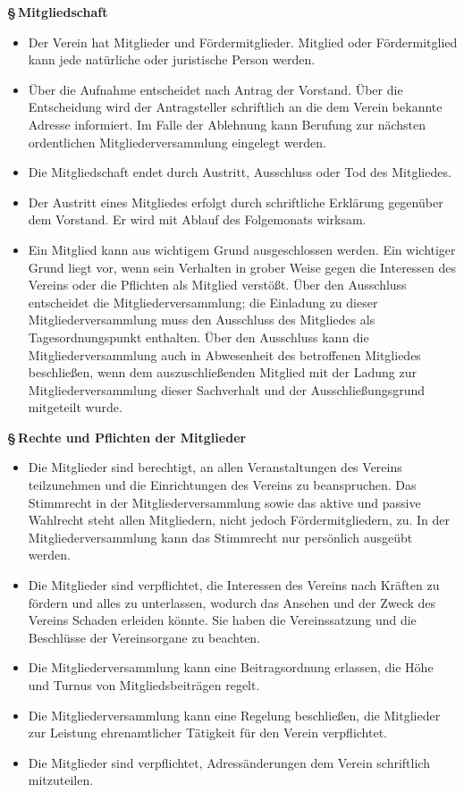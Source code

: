 \documentclass[11pt]{article}
\def\items#1{{%
  \itcounter0%
  \begin{itemize}
  #1
  \end{itemize}
}}
\let\it\item%
\def\item{
  \advance\itcounter1%
  \it[(\the\itcounter)]
}
\def\paragraf#1{
  \advance\itcounter1%
  \par\medskip
  {\large\bfseries \S\,\the\itcounter\quad#1}
  \par\smallskip
}
\begin{document}
\paragraf{Mitgliedschaft}

\items{
   \item Der Verein hat Mitglieder und F{\"o}rdermitglieder. Mitglied oder
   F{\"o}rdermitglied kann jede nat\"urliche oder juristische Person werden.
   \item {\"U}ber die Aufnahme entscheidet nach Antrag der Vorstand.
       {\"U}ber die Entscheidung wird der Antragsteller schriftlich an die dem Verein bekannte Adresse informiert.
       Im Falle der Ablehnung kann Berufung zur n{\"a}chsten
       ordentlichen Mitgliederversammlung eingelegt werden.
   \item Die Mitgliedschaft endet durch Austritt, Ausschluss oder Tod des Mitgliedes.
   \item Der Austritt eines Mitgliedes erfolgt durch schriftliche Erkl{\"a}rung gegen{\"u}ber
       dem Vorstand. Er wird mit Ablauf des Folgemonats wirksam.
   \item Ein Mitglied kann aus wichtigem Grund ausgeschlossen werden. Ein
       wichtiger Grund liegt vor, wenn sein Verhalten in grober Weise gegen die
       Interessen des Vereins oder die Pflichten als Mitglied verst{\"o}{\ss}t.
       {\"U}ber den Ausschluss entscheidet die Mitgliederversammlung;
       die Einladung zu dieser Mitgliederversammlung muss den Ausschluss des
       Mitgliedes als Tagesordnungspunkt enthalten.
       {\"U}ber den Ausschluss kann die Mitgliederversammlung auch in
       Abwesenheit des betroffenen Mitgliedes beschlie{\ss}en, wenn
       dem auszuschlie{\ss}enden Mitglied mit der Ladung zur Mitgliederversammlung
       dieser Sachverhalt und der Ausschlie{\ss}ungsgrund
       mitgeteilt wurde.
}

\paragraf{Rechte und Pflichten der Mitglieder}

\items{
   \item Die Mitglieder sind berechtigt, an allen Veranstaltungen des Vereins
       teilzunehmen und die Einrichtungen des Vereins zu beanspruchen. Das
       Stimmrecht in der Mitgliederversammlung sowie das aktive und passive
       Wahlrecht steht allen Mitgliedern, nicht jedoch F{\"o}rdermitgliedern, zu.
       In der Mitgliederversammlung kann das Stimmrecht nur pers{\"o}nlich ausge{\"u}bt werden.
   \item Die Mitglieder sind verpflichtet, die Interessen des Vereins nach Kr{\"a}ften zu
       f{\"o}rdern und alles zu unterlassen, wodurch das Ansehen und der Zweck des
       Vereins Schaden erleiden k{\"o}nnte. Sie haben die Vereinssatzung und die
       Beschl{\"u}sse der Vereinsorgane zu beachten.
   \item Die Mitgliederversammlung kann eine Beitragsordnung erlassen, die H{\"o}he und
       Turnus von Mitgliedsbeitr{\"a}gen regelt.
   \item Die Mitgliederversammlung kann eine Regelung beschlie{\ss}en, die Mitglieder
       zur Leistung ehrenamtlicher T{\"a}tigkeit f{\"u}r den Verein verpflichtet.
   \item Die Mitglieder sind verpflichtet, Adress{\"a}nderungen dem Verein schriftlich mitzuteilen.
}
\end{document}
